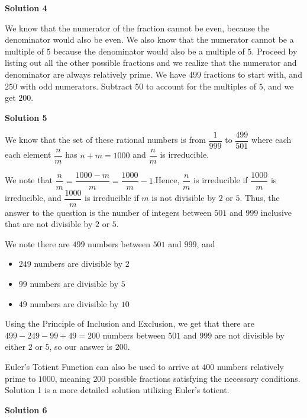\begin{enumerate}
 



\textbf{Solution 4}

We know that the numerator of the fraction cannot be even, because the denominator would also be even. We also know that the numerator cannot be a multiple of $5$ because the denominator would also be a multiple of $5$. Proceed by listing out all the other possible fractions and we realize that the numerator and denominator are always relatively prime. We have $499$ fractions to start with, and $250$ with odd numerators. Subtract $50$ to account for the multiples of $5$, and we get $\boxed{200}$.

 



\textbf{Solution 5}

We know that the set of these rational numbers is from $\dfrac{1}{999}$ to $\dfrac{499}{501}$ where each each element $\dfrac{n}{m}$ has $n+m =1000$ and $\dfrac{n}{m}$ is irreducible. 

 We note that $\dfrac{n}{m} =\dfrac{1000-m}{m}=\dfrac{1000}{m}-1$.Hence, $\dfrac{n}{m}$ is irreducible if $\dfrac{1000}{m}$ is irreducible, and $\dfrac{1000}{m}$ is irreducible if $m$ is not divisible by $2$ or $5$. Thus, the answer to the question is the number of integers between $501$ and $999$ inclusive that are not divisible by $2$ or $5$.

 We note there are $499$ numbers between $501$ and $999$, and

 
            \begin{itemize}
        \item $249$ numbers are divisible by $2$
        \item $99$ numbers are divisible by $5$
        \item $49$ numbers are divisible by $10$
            \end{itemize}
            Using the Principle of Inclusion and Exclusion, we get that there are $499-249-99+49=200$ numbers between $501$ and $999$ are not divisible by either $2$ or $5$, so our answer is $\boxed{200}$.

 Euler's Totient Function can also be used to arrive at $400$ numbers relatively prime to $1000$, meaning $200$ possible fractions satisfying the necessary conditions. Solution 1 is a more detailed solution utilizing Euler's totient.

 



\textbf{Solution 6}


\end{enumerate}
